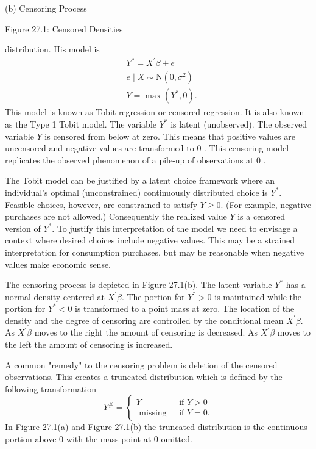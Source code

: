 \documentclass[10pt]{article}
\begin{document}
(b) Censoring Process

Figure 27.1: Censored Densities

distribution. His model is
$$
\begin{aligned}
&Y^{*}=X^{\prime} \beta+e \\
&e \mid X \sim \mathrm{N}\left(0, \sigma^{2}\right) \\
&Y=\max \left(Y^{*}, 0\right) .
\end{aligned}
$$
This model is known as Tobit regression or censored regression. It is also known as the Type 1 Tobit model. The variable $Y^{*}$ is latent (unobserved). The observed variable $Y$ is censored from below at zero. This means that positive values are uncensored and negative values are transformed to 0 . This censoring model replicates the observed phenomenon of a pile-up of observations at 0 .

The Tobit model can be justified by a latent choice framework where an individual's optimal (unconstrained) continuously distributed choice is $Y^{*}$. Feasible choices, however, are constrained to satisfy $Y \geq 0$. (For example, negative purchases are not allowed.) Consequently the realized value $Y$ is a censored version of $Y^{*}$. To justify this interpretation of the model we need to envisage a context where desired choices include negative values. This may be a strained interpretation for consumption purchases, but may be reasonable when negative values make economic sense.

The censoring process is depicted in Figure 27.1(b). The latent variable $Y^{*}$ has a normal density centered at $X^{\prime} \beta$. The portion for $Y^{*}>0$ is maintained while the portion for $Y^{*}<0$ is transformed to a point mass at zero. The location of the density and the degree of censoring are controlled by the conditional mean $X^{\prime} \beta$. As $X^{\prime} \beta$ moves to the right the amount of censoring is decreased. As $X^{\prime} \beta$ moves to the left the amount of censoring is increased.

A common "remedy" to the censoring problem is deletion of the censored observations. This creates a truncated distribution which is defined by the following transformation
$$
Y^{\#}=\left\{\begin{array}{cc}
Y & \text { if } Y>0 \\
\text { missing } & \text { if } Y=0 .
\end{array}\right.
$$
In Figure 27.1(a) and Figure 27.1(b) the truncated distribution is the continuous portion above 0 with the mass point at 0 omitted.
\end{document}
